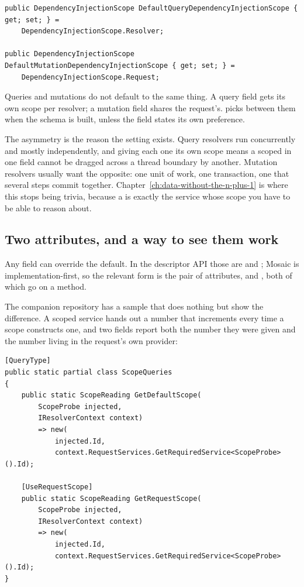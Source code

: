 \begin{verbatim}
public DependencyInjectionScope DefaultQueryDependencyInjectionScope { get; set; } =
    DependencyInjectionScope.Resolver;

public DependencyInjectionScope DefaultMutationDependencyInjectionScope { get; set; } =
    DependencyInjectionScope.Request;
\end{verbatim}

%
Queries and mutations do not default to the same thing. A query field gets its
own scope per resolver; a mutation field shares the request's. 
picks between them when the schema is built, unless the field states its own
preference.

The asymmetry is the reason the setting exists.
Query resolvers run concurrently and mostly independently, and giving each one
its own scope means a scoped  in one field cannot be dragged
across a thread boundary by another. Mutation resolvers usually want the
opposite: one unit of work, one transaction, one  that several
steps commit together. Chapter~\ref{ch:data-without-the-n-plus-1} is where this
stops being trivia, because a  is exactly the service whose
scope you have to be able to reason about.

\subsection*{Two attributes, and a way to see them work}

%
Any field can override the default. In the descriptor API those are
 and ; Mosaic is
implementation-first, so the relevant form is the pair of attributes,
\code{[UseRequestScope]} and \code{[UseResolverScope]}, both of which go on a
method.

The companion repository has a sample that does nothing but show the difference.
A scoped service hands out a number that increments every time a scope
constructs one, and two fields report both the number they were given and the
number living in the request's own provider:

\begin{verbatim}
[QueryType]
public static partial class ScopeQueries
{
    public static ScopeReading GetDefaultScope(
        ScopeProbe injected,
        IResolverContext context)
        => new(
            injected.Id,
            context.RequestServices.GetRequiredService<ScopeProbe>().Id);

    [UseRequestScope]
    public static ScopeReading GetRequestScope(
        ScopeProbe injected,
        IResolverContext context)
        => new(
            injected.Id,
            context.RequestServices.GetRequiredService<ScopeProbe>().Id);
}
\end{verbatim}

